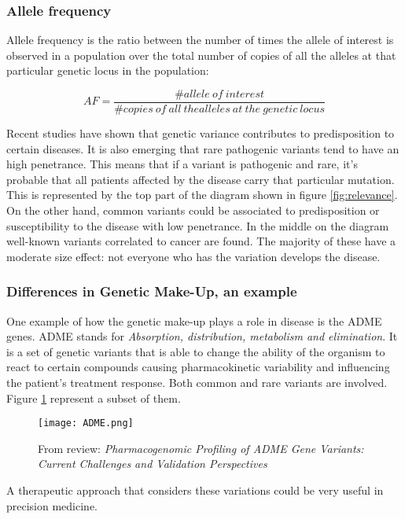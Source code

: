 		\subsubsection{Allele frequency}
		Allele frequency is the ratio between the number of times the allele of interest is observed in a population over the total number of copies of all the alleles at that particular genetic locus in the population:

		$$AF = \frac{\# allele\ of\ interest}{\# copies\ of\ all\ the alleles\ at\ the\ genetic\ locus}$$

		Recent studies have shown that genetic variance contributes to predisposition to certain diseases.
		It is also emerging that rare pathogenic variants tend to have an high penetrance.
		This means that if a variant is pathogenic and rare, it's probable that all patients affected by the disease carry that particular mutation.
		This is represented by the top part of the diagram shown in figure \ref{fig:relevance}.
		On the other hand, common variants could be associated to predisposition or susceptibility to the disease with low penetrance.
		In the middle on the diagram well-known variants correlated to cancer are found.
		The majority of these have a moderate size effect: not everyone who has the variation develops the disease.

		\subsubsection{Differences in Genetic Make-Up, an example}
		One example of how the genetic make-up plays a role in disease is the ADME genes.
		ADME stands for \textit{Absorption, distribution, metabolism and elimination}.
		It is a set of genetic variants that is able to change the ability of the organism to react to certain compounds causing pharmacokinetic variability and influencing the patient's treatment response.
		Both common and rare variants are involved.
		Figure \ref{fig:adme} represent a subset of them.

		\begin{figure}[H]
			\centering
			\texttt{[image: ADME.png]}
			\caption{From review: \textit{Pharmacogenomic Profiling of ADME Gene Variants: Current Challenges and Validation Perspectives}}
			\label{fig:adme}
		\end{figure}

		A therapeutic approach that considers these variations could be very useful in precision medicine.

